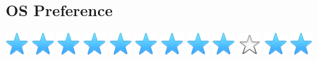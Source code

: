 \documentclass[]{cv-class}
\begin{document}
\begin{aside}
  \section{OS Preference}
    {\includegraphics[scale=0.30]{img/star.png}
    \includegraphics[scale=0.30]{img/star.png}
    \includegraphics[scale=0.30]{img/star.png}
    \includegraphics[scale=0.30]{img/star.png}
    \includegraphics[scale=0.30]{img/star.png}}
    {\includegraphics[scale=0.30]{img/star.png}
    \includegraphics[scale=0.30]{img/star.png}
    \includegraphics[scale=0.30]{img/star.png}
    \includegraphics[scale=0.30]{img/star.png}
    \includegraphics[scale=0.30]{img/star_empty.png}}
    {\includegraphics[scale=0.30]{img/star.png}
    \includegraphics[scale=0.30]{img/star.png}
}
\end{aside}
\end{document}
